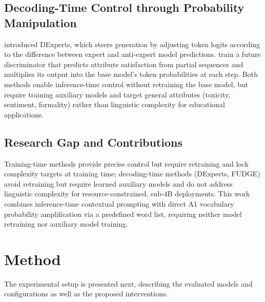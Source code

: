 \documentclass[10pt, a4paper]{article}
\begin{document}
\subsection{Decoding-Time Control through Probability Manipulation}

\citet{liu2021dexperts} introduced DExperts, which steers generation by adjusting token logits
according to the difference between expert and anti-expert model predictions.
\citet{yang2021fudge} train a future discriminator that predicts attribute satisfaction from
partial sequences and multiplies its output into the base model's token probabilities at each
step.
Both methods enable inference-time control without retraining the base model, but require
training auxiliary models and target general attributes (toxicity, sentiment, formality) rather
than linguistic complexity for educational applications.

\subsection{Research Gap and Contributions}

Training-time methods provide precise control but require retraining and lock complexity targets
at training time; decoding-time methods (DExperts, FUDGE) avoid retraining but require learned
auxiliary models and do not address linguistic complexity for resource-constrained, sub-4B
deployments.
This work combines inference-time contextual prompting with direct A1 vocabulary probability
amplification via a predefined word list, requiring neither model retraining nor auxiliary model
training.

\section{Method}
The experimental setup is presented next, describing the evaluated models and configurations as well as the proposed interventions.
\end{document}
